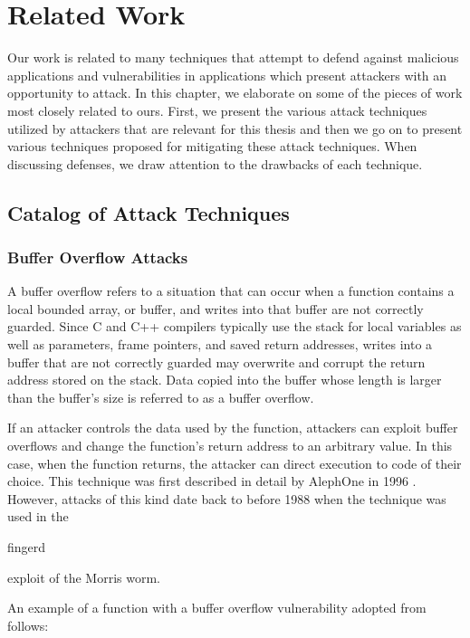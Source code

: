 
\renewcommand{\thechapter}{2}

\chapter{Related Work}

Our work is related to many techniques that attempt to defend against malicious applications and
vulnerabilities in applications which present attackers with an opportunity to attack. In this
chapter, we elaborate on some of the pieces of work most closely related to ours. First, we present
the various attack techniques utilized by attackers that are relevant for this thesis and then we go
on to present various techniques proposed for mitigating these attack techniques. When discussing
defenses, we draw attention to the drawbacks of each technique.

\section{Catalog of Attack Techniques}

\subsection{Buffer Overflow Attacks}

A buffer overflow refers to a situation that can occur when a function contains a local bounded
array, or buffer, and writes into that buffer are not correctly guarded. Since C and C++ compilers
typically use the stack for local variables as well as parameters, frame pointers, and saved return
addresses, writes into a buffer that are not correctly guarded may overwrite and corrupt the return
address stored on the stack. Data copied into the buffer whose length is larger than the buffer's
size is referred to as a buffer overflow.

If an attacker controls the data used by the function, attackers can exploit buffer overflows and
change the function's return address to an arbitrary value. In this case, when the function returns,
the attacker can direct execution to code of their choice. This technique was first described in
detail by AlephOne in 1996 \cite{}. However, attacks of this kind date back to before 1988 when the
technique was used in the \begin{em}fingerd\end{em} exploit of the Morris worm.

An example of a function with a buffer overflow vulnerability adopted from \cite{erlingsson-07} follows:

